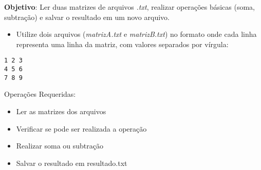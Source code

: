 \textbf{Objetivo}:
Ler duas matrizes de arquivos \textit{.txt}, realizar operações básicas (soma, subtração) e salvar o resultado em um novo arquivo.

\begin{itemize}
    \item Utilize dois arquivos (\textit{matrizA.txt} e \textit{matrizB.txt}) no formato onde cada linha representa uma linha da matriz, com valores separados por vírgula:
\end{itemize}

\begin{verbatim}
1 2 3
4 5 6
7 8 9
\end{verbatim}

Operações Requeridas:
\begin{itemize}


       \item  Ler as matrizes dos arquivos

      \item   Verificar se pode ser realizada a operação

      \item   Realizar soma ou subtração

      \item   Salvar o resultado em resultado.txt
\end{itemize}
